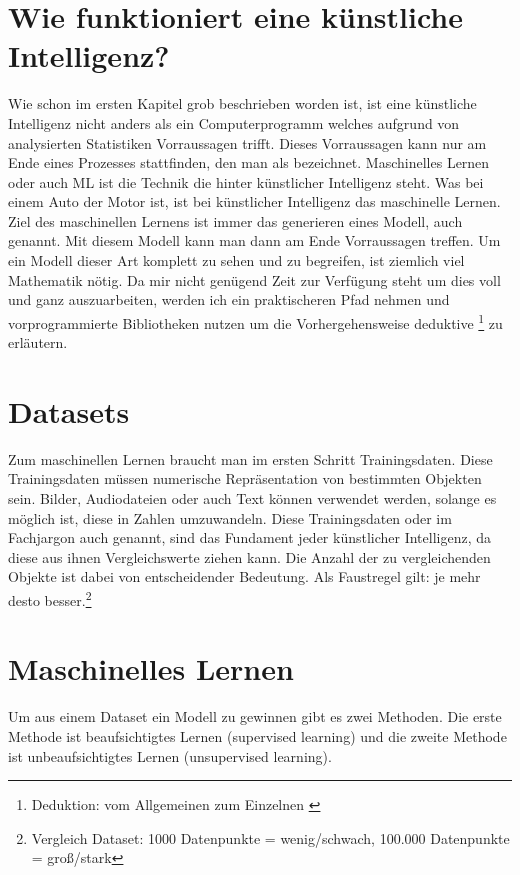 \documentclass[a4paper,12pt,german,ngerman]{report}
\begin{document}
    \section{Wie funktioniert eine künstliche Intelligenz?}
        Wie schon im ersten Kapitel grob beschrieben worden ist, ist eine künstliche Intelligenz nicht anders als ein
        Computerprogramm welches aufgrund von analysierten Statistiken Vorraussagen trifft. Dieses Vorraussagen kann
        nur am Ende eines Prozesses stattfinden, den man als  bezeichnet. Maschinelles Lernen
        oder auch ML ist die Technik die hinter künstlicher Intelligenz steht. Was bei einem Auto der Motor ist,
        ist bei künstlicher Intelligenz das maschinelle Lernen. Ziel des maschinellen Lernens ist immer das generieren
        eines Modell, auch  genannt. Mit diesem Modell kann man dann am Ende Vorraussagen treffen.
        Um ein Modell dieser Art komplett zu sehen und zu begreifen, ist ziemlich viel Mathematik nötig. Da mir nicht
        genügend Zeit zur Verfügung steht um dies voll und ganz auszuarbeiten, werden ich ein praktischeren Pfad nehmen
        und vorprogrammierte Bibliotheken nutzen um die Vorhergehensweise deduktive \footnote{Deduktion: vom Allgemeinen zum Einzelnen \cite{deduktion2021unileipzig}}
        zu erläutern.

    \section{Datasets}
        Zum maschinellen Lernen braucht man im ersten Schritt Trainingsdaten. Diese Trainingsdaten müssen numerische
        Repräsentation von bestimmten Objekten sein. Bilder, Audiodateien oder auch Text können verwendet werden,
        solange es möglich ist, diese in Zahlen umzuwandeln. Diese Trainingsdaten oder im Fachjargon auch 
        genannt, sind das Fundament jeder künstlicher Intelligenz, da diese aus ihnen Vergleichswerte ziehen kann. Die Anzahl
        der zu vergleichenden Objekte ist dabei von entscheidender Bedeutung. Als Faustregel gilt: je mehr desto besser.\footnote{Vergleich Dataset: 1000 Datenpunkte = wenig/schwach, 100.000 Datenpunkte = groß/stark}

    \section{Maschinelles Lernen}
        Um aus einem Dataset ein Modell zu gewinnen gibt es zwei Methoden. Die erste Methode ist beaufsichtigtes Lernen (supervised learning) und
        die zweite Methode ist unbeaufsichtigtes Lernen (unsupervised learning).
\end{document}
